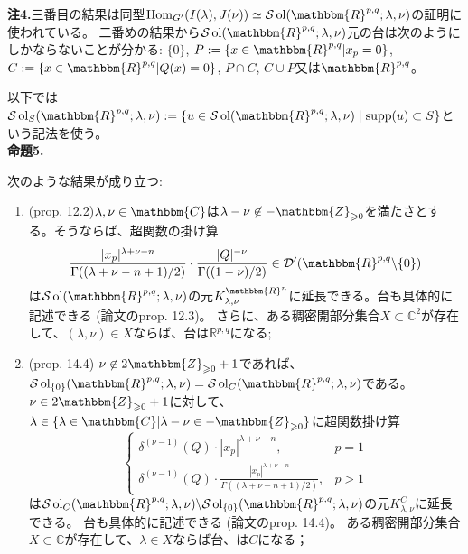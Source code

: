 \documentclass[a4paper]{article} %
\newcommand{\assign}{:=}
\newcommand{\nin}{\not\in}
\newcommand{\tmop}[1]{\ensuremath{\operatorname{#1}}}
\newcommand{\tmtextbf}[1]{{\bfseries{#1}}}
\newcommand{\tmtextit}[1]{{\itshape{#1}}}
\begin{document}
{\noindent}\tmtextbf{注\textbf{4}.}三番目の結果は同型$\tmop{Hom}_{G'} ( I ( \lambda), J ( \nu)) \simeq
\mathcal{S} \tmop{ol} ( \mathbbm{R}^{p, q} ; \lambda, \nu)$の証明に使われている。
二番めの結果から$\mathcal{S} \tmop{ol} (
\mathbbm{R}^{p, q} ; \lambda, \nu)$元の台は次のようにしかならないことが分かる: $\{ 0
\}$, $P \assign \{ x \in \mathbbm{R}^{p, q} | x_p = 0 \}$, $C \assign \{ x \in
\mathbbm{R}^{p, q} | Q ( x) = 0 \}$, $P \cap C$, $C \cup P$又は$\mathbbm{R}^{p, q}$。

以下では$\mathcal{S} \tmop{ol}_S ( \mathbbm{R}^{p,
q} ; \lambda, \nu):=\{u\in\mathcal{S} \tmop{ol} ( \mathbbm{R}^{p,
q} ; \lambda, \nu)\mid \supp(u)\subset S\}$という記法を使う。\\

{\noindent}\tmtextbf{命題\textbf{5}.}\tmtextit{次のような結果が成り立つ:
\begin{enumerate}
 \item (prop. 12.2)$\lambda, \nu \in \mathbbm{C}$は$\lambda - \nu \nin -\mathbbm{Z}_{\geqslant 0}$を満たさとする。そうならば、超関数の掛け算
 \[ \frac{| x_p |^{\lambda + \nu - n}}{\Gamma ( ( \lambda + \nu - n + 1) /
 2)} \cdot \frac{| Q |^{- \nu}}{\Gamma ( ( 1 - \nu) / 2)} \in \mathcal{D}'
 ( \mathbbm{R}^{p, q} \backslash \{ 0 \}) \]
 は$\mathcal{S} \tmop{ol} (
 \mathbbm{R}^{p, q} ; \lambda, \nu)$の元$K_{\lambda, \nu}^{\mathbbm{R}^n}$に延長できる。台も具体的に記述できる
 (論文のprop. 12.3)。
 さらに、ある稠密開部分集合$X\subset\mathbb{C}^2$が存在して、$(\lambda,\nu)\in X$ならば、台は$\mathbb{R}^{p,q}$になる;
 
 \item (prop. 14.4) $\nu \nin
 2\mathbbm{Z}_{\geqslant 0} + 1$であれば、$\mathcal{S} \tmop{ol}_{\{ 0 \}} (
 \mathbbm{R}^{p, q} ; \lambda, \nu) =\mathcal{S} \tmop{ol}_C (
 \mathbbm{R}^{p, q} ; \lambda, \nu)$である。$\nu \in
 2\mathbbm{Z}_{\geqslant 0} + 1$に対して、$\lambda \in \{ \lambda \in
 \mathbbm{C} | \lambda - \nu \in -\mathbbm{Z}_{\geqslant 0} \}$に超関数掛け算
 \[ \left\{ \begin{array}{ll}
 \delta^{( \nu - 1)} ( Q) \cdot | x_p |^{\lambda + \nu - n}, & p = 1\\
 \delta^{( \nu - 1)} ( Q) \cdot \frac{| x_p |^{\lambda + \nu -
 n}}{\Gamma ( ( \lambda + \nu - n + 1) / 2)}, & p > 1
 \end{array} \right. \]
 は$\mathcal{S} \tmop{ol}_C (
 \mathbbm{R}^{p, q} ; \lambda, \nu) \backslash\mathcal{S} \tmop{ol}_{\{ 0 \}}
 ( \mathbbm{R}^{p, q} ; \lambda, \nu)$の元$K_{\lambda, \nu}^C$に延長できる。
台も具体的に記述できる
 (論文のprop. 14.4)。
 ある稠密開部分集合$X\subset\mathbb{C}$が存在して、$\lambda\in X$ならば台、は$C$になる；
 

\end{enumerate}}
\end{document}
